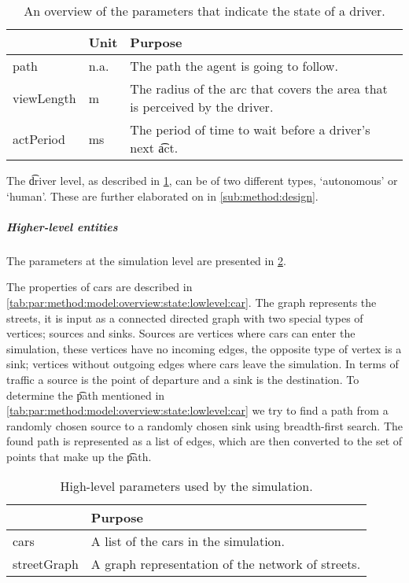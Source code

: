 	\begin{table}
		\centering
		\begin{tabularx}{\textwidth}{>{\ttfamily}llX}
			\toprule
			\normalfont{Parameter}	&Unit & Purpose \\ 
			\midrule
			path					
				& n.a. 
				& The path the agent is going to follow. \\ 
			viewLength 			
				& \si{\meter}
				& The radius of the arc that covers the area that is perceived by the driver.\\ 
			actPeriod
				& \si{\milli\second}
				& The period of time to wait before a driver's next \t{act}. 
			\bottomrule
		\end{tabularx}
		\caption{An overview of the parameters that indicate the state of a driver.}
		\label{tab:par:method:model:overview:state:lowlevel:driver}
	\end{table}

	The \t{driver} level, as described in \cref{tab:par:method:model:overview:state:lowlevel:driver}, can be of two different types, `autonomous' or `human'. These are further elaborated on in \cref{sub:method:design}.

	\subparagraph{Higher-level entities}
	The parameters at the simulation level are presented in \cref{tab:par:method:model:overview:state:highlevel:sim}.

	The properties of cars are described in \cref{tab:par:method:model:overview:state:lowlevel:car}. The graph represents the streets, it is input as a connected directed graph with two special types of vertices; sources and sinks. Sources are vertices where cars can enter the simulation, these vertices have no incoming edges, the opposite type of vertex is a sink; vertices without outgoing edges where cars leave the simulation. In terms of traffic a source is the point of departure and a sink is the destination. To determine the \t{path} mentioned in \cref{tab:par:method:model:overview:state:lowlevel:car} we try to find a path from a randomly chosen source to a randomly chosen sink using breadth-first search. The found path is represented as a list of edges, which are then converted to the set of points that make up the \t{path}.
	
	\begin{table}[H]
		\centering
		\begin{tabularx}{\textwidth}{>{\ttfamily}lX}
			\toprule
			\normalfont{Parameter}	& Purpose \\  
			\midrule
			cars 					& A list of the cars in the simulation. \\ 
			streetGraph		 		& A graph representation of the network of streets. \\ 
			\bottomrule
		\end{tabularx}
		\caption{High-level parameters used by the simulation.}
		\label{tab:par:method:model:overview:state:highlevel:sim}
	\end{table}


